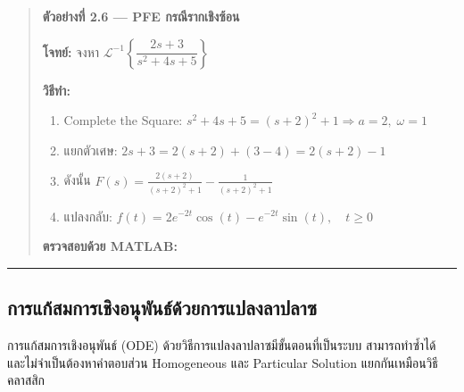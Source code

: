 \begin{quote}
\textbf{ตัวอย่างที่ 2.6 --- PFE กรณีรากเชิงซ้อน}

\textbf{โจทย์:} จงหา
\(\mathcal{L}^{-1}\!\left\{\dfrac{2s+3}{s^2+4s+5}\right\}\)

\textbf{วิธีทำ:}

\begin{enumerate}
\def\labelenumi{\arabic{enumi}.}
\tightlist
\item
  Complete the Square:
  \(s^2+4s+5 = (s+2)^2+1 \Rightarrow a=2,\;\omega=1\)
\item
  แยกตัวเศษ: \(2s+3 = 2(s+2) + (3-4) = 2(s+2) - 1\)
\item
  ดังนั้น
  \(\displaystyle F(s) = \frac{2(s+2)}{(s+2)^2+1} - \frac{1}{(s+2)^2+1}\)
\item
  แปลงกลับ:
  \(\boxed{f(t) = 2e^{-2t}\cos(t) - e^{-2t}\sin(t),\quad t \geq 0}\)
\end{enumerate}

\textbf{ตรวจสอบด้วย MATLAB:}

\begin{Shaded}
\begin{Highlighting}[]
 \OperatorTok{;}  \OperatorTok{=}\NormalTok{ (}\OperatorTok{*}\OperatorTok{+}\NormalTok{)}\OperatorTok{/}\NormalTok{(}\OperatorTok{\^{}}\OperatorTok{+}\OperatorTok{*}\OperatorTok{+}\NormalTok{)}\OperatorTok{;} \NormalTok{(}\NormalTok{)}
\end{Highlighting}
\end{Shaded}
\end{quote}

\begin{center}\rule{0.5\linewidth}{0.5pt}\end{center}

\subsection{การแก้สมการเชิงอนุพันธ์ด้วยการแปลงลาปลาซ}\label{uxe01uxe32uxe23uxe41uxe01uxe2auxe21uxe01uxe32uxe23uxe40uxe0auxe07uxe2duxe19uxe1euxe19uxe18uxe14uxe27uxe22uxe01uxe32uxe23uxe41uxe1buxe25uxe07uxe25uxe32uxe1buxe25uxe32uxe0b}

การแก้สมการเชิงอนุพันธ์ (ODE) ด้วยวิธีการแปลงลาปลาซมีขั้นตอนที่เป็นระบบ สามารถทำซ้ำได้
และไม่จำเป็นต้องหาคำตอบส่วน Homogeneous และ Particular Solution
แยกกันเหมือนวิธีคลาสสิก

